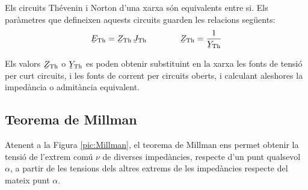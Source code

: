 Els circuits Th\'{e}venin i Norton d'una xarxa s\'{o}n equivalents entre si.
Els par\`{a}metres que defineixen aquests circuits guarden les relacions
seg\"{u}ents:
\begin{equation}\label{eq:Thevenin-Norton}
   \cmplx{E}\ped{Th} = \cmplx{Z}\ped{Th} \, \cmplx{J}\ped{Th} \qquad\qquad \cmplx{Z}\ped{Th} = \frac{1}{\cmplx{Y}\ped{Th}}
\end{equation}

Els valors $\cmplx{Z}\ped{Th}$ o  $\cmplx{Y}\ped{Th}$ es poden
obtenir substituint en la xarxa  les fonts de tensi\'{o}  per curt
circuits, i  les fonts de corrent per circuits oberts, i calculant
aleshores la imped\`{a}ncia o admit\`{a}ncia equivalent.

\subsection{Teorema de Millman}

Atenent a la Figura \vref{pic:Millman}, el teorema
de Millman ens permet
obtenir la tensi\'{o} de l'extrem com\'{u} $\nu$ de diverses imped\`{a}ncies, respecte d'un punt
qualsevol $\alpha$, a partir de les tensions dels altres extrems de les imped\`{a}ncies respecte
 del mateix punt $\alpha$.

